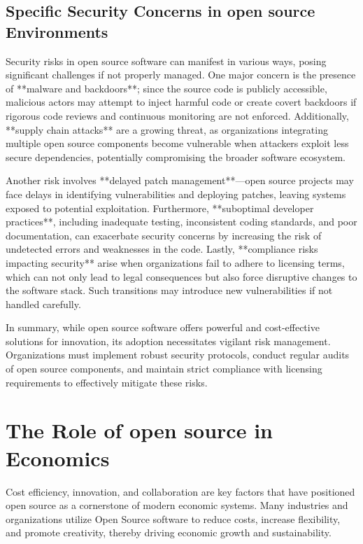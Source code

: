 \cite{OpenSource-Software-Risks-Disadvantages}

\subsection{Specific Security Concerns in open source Environments}

Security risks in open source software can manifest in various ways, posing significant challenges if not properly managed. One major concern is the presence of **malware and backdoors**; since the source code is publicly accessible, malicious actors may attempt to inject harmful code or create covert backdoors if rigorous code reviews and continuous monitoring are not enforced. Additionally, **supply chain attacks** are a growing threat, as organizations integrating multiple open source components become vulnerable when attackers exploit less secure dependencies, potentially compromising the broader software ecosystem. 

Another risk involves **delayed patch management**—open source projects may face delays in identifying vulnerabilities and deploying patches, leaving systems exposed to potential exploitation. Furthermore, **suboptimal developer practices**, including inadequate testing, inconsistent coding standards, and poor documentation, can exacerbate security concerns by increasing the risk of undetected errors and weaknesses in the code. Lastly, **compliance risks impacting security** arise when organizations fail to adhere to licensing terms, which can not only lead to legal consequences but also force disruptive changes to the software stack. Such transitions may introduce new vulnerabilities if not handled carefully.

\cite{OpenSource-Software-Risks-ConnectWise}

In summary, while open source software offers powerful and cost-effective solutions for innovation, its adoption necessitates vigilant risk management. Organizations must implement robust security protocols, conduct regular audits of open source components, and maintain strict compliance with licensing requirements to effectively mitigate these risks.

\section{The Role of open source in Economics}

Cost efficiency, innovation, and collaboration are key factors that have positioned open source as a cornerstone of modern economic systems. Many industries and organizations utilize Open Source software to reduce costs, increase flexibility, 
and promote creativity, thereby driving economic growth and sustainability.

